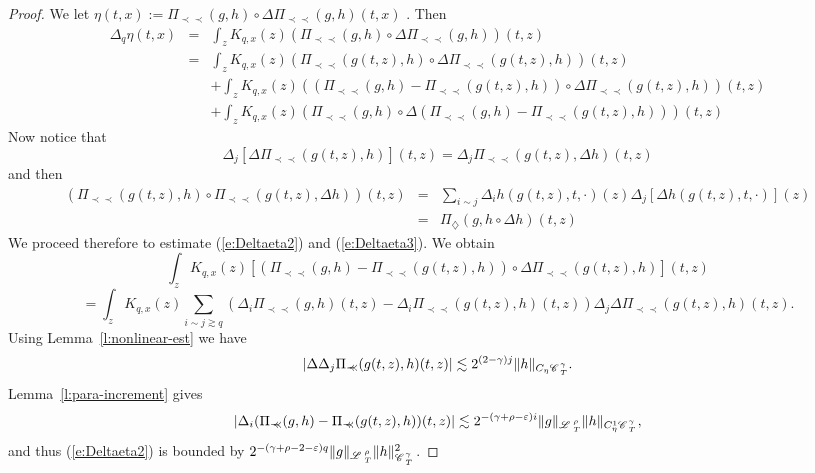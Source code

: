 \documentclass[11pt,reqno]{amsart}
\newcommand{\assign}{:=}
\newcommand{\cdummy}{\cdot}
\newcommand{\precprec}{\prec\!\!\!\prec}
\newcommand{\CC}{\mathscr{C} \hspace{.1em}}
\newcommand{\LL}{\mathscr{L} \hspace{.2em}}
\begin{document}
\begin{proof}
  We let $\eta (t, x) \assign \Pi_{\precprec} (g, h) \circ \Delta
  \Pi_{\precprec} (g, h) (t, x)$ . Then
  \begin{eqnarray}
    \Delta_q \eta (t, x) & = & \int_z K_{q, x} (z) (\Pi_{\precprec} (g, h)
    \circ \Delta \Pi_{\precprec} (g, h)) (t, z) \nonumber\\
    & = & \int_z K_{q, x} (z) (\Pi_{\precprec} (g (t, z), h) \circ \Delta
    \Pi_{\precprec} (g (t, z), h)) (t, z) \nonumber\\
    &  & + \int_z K_{q, x} (z) ((\Pi_{\precprec} (g, h) - \Pi_{\precprec} (g
    (t, z), h)) \circ \Delta \Pi_{\precprec} (g (t, z), h)) (t, z) 
    \label{e:Deltaeta2}\\
    &  & + \int_z K_{q, x} (z) (\Pi_{\precprec} (g, h) \circ \Delta
    (\Pi_{\precprec} (g, h) - \Pi_{\precprec} (g (t, z), h))) (t, z) 
    \label{e:Deltaeta3}
  \end{eqnarray}
  Now notice that
  \[ \Delta_j [\Delta \Pi_{\precprec} (g (t, z), h)] (t, z) = \Delta_j
     \Pi_{\precprec} (g (t, z), \Delta h) (t, z) \]
  and then
  \begin{eqnarray*}
    (\Pi_{\precprec} (g (t, z), h) \circ \Pi_{\precprec} (g (t, z), \Delta h))
    (t, z) & = & \sum_{i \sim j} \Delta_i h (g (t, z), t, \cdummy) (z)
    \Delta_j [\Delta h (g (t, z), t, \cdummy)] (z)\\
    & = & \Pi_{\diamondsuit} (g, h \circ \Delta h) (t, z)
  \end{eqnarray*}
  We proceed therefore to estimate (\ref{e:Deltaeta2}) and
  (\ref{e:Deltaeta3}). We obtain
  \[ \int_z K_{q, x} (z) [(\Pi_{\precprec} (g, h) - \Pi_{\precprec} (g (t, z),
     h)) \circ \Delta \Pi_{\precprec} (g (t, z), h)] (t, z) \]
  \[ = \int_z K_{q, x} (z) \sum_{i \sim j \gtrsim q} (\Delta_i \Pi_{\precprec}
     (g, h) (t, z) - \Delta_i \Pi_{\precprec} (g (t, z), h) (t, z)) \Delta_j
     \Delta \Pi_{\precprec} (g (t, z), h) (t, z) . \]
  Using Lemma~\ref{l:nonlinear-est} we have
  \[ | \Delta \Delta_j \Pi_{\precprec} (g (t, z), h) (t, z) | \lesssim 2^{(2 -
     \gamma) j} \| h \|_{C_{\eta} \CC^{\gamma}_T} . \]
  Lemma~\ref{l:para-increment} gives
  \[ | \Delta_i (\Pi_{\precprec} (g, h) - \Pi_{\precprec} (g (t, z), h)) (t,
     z) | \lesssim 2^{- (\gamma + \rho - \varepsilon) i} \| g
     \|_{\LL^{\rho}_T} \| h \|_{C_{\eta}^1 \CC^{\gamma}_{_T}}, \]
  and thus (\ref{e:Deltaeta2}) is bounded by $2^{- (\gamma + \rho - 2 -
  \varepsilon) q} \| g \|_{\LL^{\rho}_T} \| h \|^2_{\CC^{\gamma}_{_T}}$.
  

\end{proof}
\end{document}
